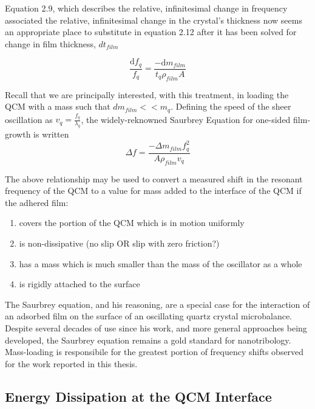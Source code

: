 Equation 2.9, which describes the relative, infinitesimal change in frequency associated the relative, infinitesimal change in the crystal's thickness now seems an appropriate place to substitute in equation 2.12 after it has been solved for change in film thickness, $dt_{film}$

\begin{equation}
\frac{\mathrm{d}f_{q}}{f_{q}} = \frac{-\mathrm{d}m_{film}}{t_{q}\rho_{film}A}
\end{equation}

Recall that we are principally interested, with this treatment, in loading the QCM with a mass such that $dm_{film} << m_{q}$. Defining the speed of the sheer oscillation as $v_{q} = \frac{f_{q}}{\lambda_{q}}$, the widely-reknowned Saurbrey Equation for one-sided film-growth is written
\begin{equation}
\Delta f = \frac{-\Delta m_{film}f_{q}^{2}}{A\rho_{film}v_{q}}
\end{equation}

The above relationship may be used to convert a measured shift in the resonant frequency of the QCM to a value for mass added to the interface of the QCM if the adhered film:

\begin{enumerate}
	\item covers the portion of the QCM which is in motion uniformly
	\item is non-dissipative (no slip OR slip with zero friction?)
	\item has a mass which is much smaller than the mass of the oscillator as a whole
	\item is rigidly attached to the surface
\end{enumerate}

The Saurbrey equation, and his reasoning, are a special case for the interaction of an adsorbed film on the surface of an oscillating quartz crystal microbalance. Despite several decades of use since his work, and more general approaches being developed, the Saurbrey equation remains a gold standard for nanotribology. Mass-loading is responsibile for the greatest portion of frequency shifts observed for the work reported in this thesis.









\subsection{Energy Dissipation at the QCM Interface}

